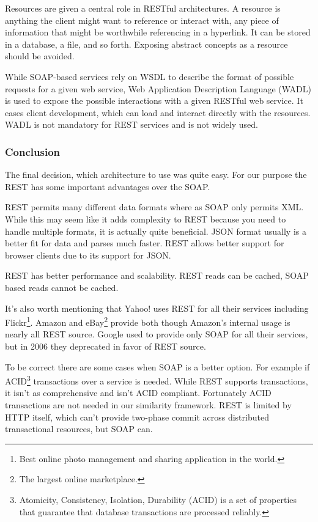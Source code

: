 \documentclass[thesis=M,english]{FITthesis}[2012/10/20]
\begin{document}
Resources are given a central role in RESTful architectures. A resource is anything the client might want to reference or interact with, any piece of information that might be worthwhile referencing in a hyperlink. It can be stored in a database, a file, and so forth. Exposing abstract concepts as a resource should be avoided. 

While SOAP-based services rely on WSDL to describe the format of possible requests for a given web service, Web Application Description Language (WADL) is used to expose the possible interactions with a given RESTful web service. It eases client development, which can load and interact directly with the resources. WADL is not mandatory for REST services and is not widely used.\cite{java}


\subsubsection{Conclusion}
The final decision, which architecture to use was quite easy. For our purpose the REST has some important advantages over the SOAP.

REST permits many different data formats where as SOAP only permits XML. While this may seem like it adds complexity to REST because you need to handle multiple formats, it is actually quite beneficial. JSON format usually is a better fit for data and parses much faster. REST allows better support for browser clients due to its support for JSON.

REST has better performance and scalability. REST reads can be cached, SOAP based reads cannot be cached.

It’s also worth mentioning that Yahoo! uses REST for all their services including Flickr\footnote{Best online photo management and sharing application in the world.}. Amazon and eBay\footnote{The largest online marketplace.} provide both though Amazon’s internal usage is nearly all REST source. Google used to provide only SOAP for all their services, but in 2006 they deprecated in favor of REST source.\cite{google}

To be correct there are some cases when SOAP is a better option. For example if ACID\footnote{Atomicity, Consistency, Isolation, Durability (ACID) is a set of properties that guarantee that database transactions are processed reliably.} transactions over a service is needed. While REST supports transactions, it isn’t as comprehensive and isn’t ACID compliant. Fortunately ACID transactions are not needed in our similarity framework. REST is limited by HTTP itself, which can’t provide two-phase commit across distributed transactional resources, but SOAP can. 
\end{document}
